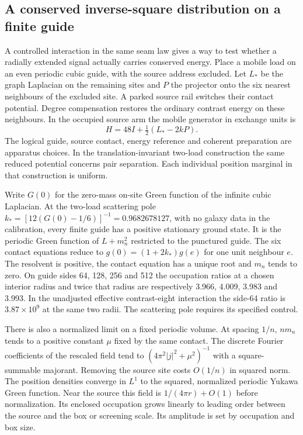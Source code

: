 \documentclass[11pt]{article}
\begin{document}
\subsection{A conserved inverse-square distribution on a finite guide}
A controlled interaction in the same seam law gives a way to test
whether a radially extended signal actually carries conserved energy.
Place a mobile load on an even periodic cubic guide, with the source
address excluded. Let $L_*$ be the graph Laplacian on the remaining
sites and $P$ the projector onto the six nearest neighbours of the
excluded site. A parked source rail switches their contact potential.
Degree compensation restores the ordinary contrast energy on these
neighbours. In the occupied source arm the mobile generator in exchange
units is
\[
 H=48I+\tfrac12(L_*-2kP).
\]
The logical guide, source contact, energy reference and coherent
preparation are apparatus choices. In the translation-invariant two-load
construction the same reduced potential concerns pair separation.
Each individual position marginal in that construction is uniform.

Write $G(0)$ for the zero-mass on-site Green function of the infinite
cubic Laplacian. At the two-load scattering pole
$k_*=[12(G(0)-1/6)]^{-1}=0.9682678127$, with no galaxy data in the
calibration, every finite guide has a positive stationary ground state.
It is the periodic Green function of $L+m_n^2$ restricted to the
punctured guide. The six contact equations reduce to
$g(0)=(1+2k_*)g(e)$ for one unit neighbour $e$. The resolvent is
positive, the contact equation has a unique root and $m_n$ tends to
zero. On guide sides 64, 128, 256 and 512 the occupation ratios at a
chosen interior radius and twice that radius are respectively
3.966, 4.009, 3.983 and 3.993. In the unadjusted effective
contrast-eight interaction the side-64 ratio is $3.87\times10^9$ at
the same two radii. The scattering pole requires its specified control.

There is also a normalized limit on a fixed periodic volume. At
spacing $1/n$, $n m_n$ tends to a positive constant $\mu$ fixed by
the same contact. The discrete Fourier coefficients of the rescaled
field tend to $(4\pi^2|j|^2+\mu^2)^{-1}$ with a square-summable
majorant. Removing the source site costs $O(1/n)$ in squared norm.
The position densities converge in $L^1$ to the squared, normalized
periodic Yukawa Green function. Near the source this field is
$1/(4\pi r)+O(1)$ before normalization. Its enclosed occupation
grows linearly to leading order between the source and the box or
screening scale. Its amplitude is set by occupation and box size.
\end{document}
